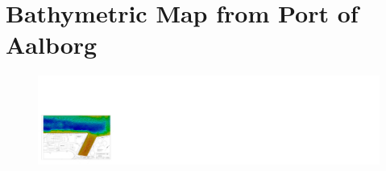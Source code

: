 \chapter{Bathymetric Map from Port of Aalborg} \label{app:bathymetricMapPortOfAalborg}

\begin{figure}[H]   %
  \includegraphics[angle=90, origin=c, width=.8\textwidth]{figures/bathymetricMapPortOfAalborg.pdf}
\end{figure}
